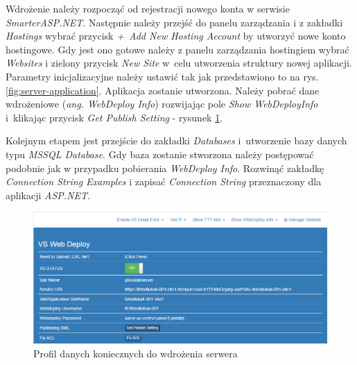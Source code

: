 \noindent Wdrożenie należy rozpocząć od rejestracji nowego konta w serwisie \textit{SmarterASP.NET}. Następnie należy przejść do panelu zarządzania i z zakładki \textit{Hostings} wybrać przycisk \textit{+~Add New Hosting Account} by utworzyć nowe konto hostingowe. Gdy jest ono gotowe należy z panelu zarządzania hostingiem wybrać \textit{Websites} i zielony przycisk \textit{New Site} w~celu utworzenia struktury nowej aplikacji. Parametry inicjalizacyjne należy ustawić tak jak przedstawiono to na rys. \ref{fig:server-application}.
 Aplikacja zostanie utworzona. Należy pobrać dane wdrożeniowe (\textit{ang. WebDeploy Info}) rozwijając pole \textit{Show WebDeployInfo} i~klikając przycisk \textit{Get Publish Setting} - rysunek \ref{fig:webdeploy-info}.
 
 Kolejnym etapem jest przejście do zakładki \textit{Databases} i~utworzenie bazy danych typu \textit{MSSQL Database}. Gdy baza zostanie stworzona należy postępować podobnie jak w przypadku pobierania \textit{WebDeploy Info}. Rozwinąć zakładkę \textit{Connection String Examples} i zapisać \textit{Connection String} przeznaczony dla aplikacji \textit{ASP.NET}.
 
 \vspace{15mm}
 
\begin{figure}[ht]
	\centering
	\includegraphics[width=1\linewidth]{graphics/chapter-4/server-webdeploy-info.png}
	\caption{Profil danych koniecznych do wdrożenia serwera}
	\label{fig:webdeploy-info}
\end{figure}

